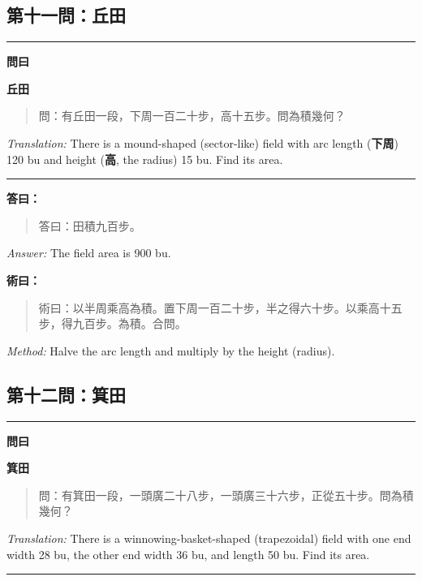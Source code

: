 \documentclass[11pt,a4paper]{article}
\newenvironment{problem}[1][]{%
  \medskip\noindent\rule{\textwidth}{0.4pt}%
  \par\noindent\textbf{\color{sectioncolor}#1}\par\nopagebreak%
  \smallskip%
}{%
  \par\noindent\rule{\textwidth}{0.4pt}\medskip%
}
\newenvironment{answer}{%
  \medskip\noindent{\color{answercolor}\rule{0.5\textwidth}{0.5pt}}%
  \par\color{answercolor}%
}{%
  \par\medskip%
}
\newenvironment{method}{%
  \medskip\noindent{\color{methodcolor}\rule{0.5\textwidth}{0.5pt}}%
  \par\color{methodcolor}%
}{%
  \par\medskip%
}
\begin{document}
\subsection*{第十一問：丘田}

\begin{problem}[\textbf{問曰}]
\textbf{\color{sectioncolor}丘田}

\begin{quote}
\textcolor{chinacolor}{%
問：有丘田一段，下周一百二十步，高十五步。問為積幾何？
}
\end{quote}

\textit{Translation:} There is a mound-shaped (sector-like) field with 
arc length (\textbf{下周}) 120 bu and height (\textbf{高}, the radius) 15 bu. 
Find its area.
\end{problem}

\begin{answer}
\textbf{答曰：}

\begin{quote}
\textcolor{chinacolor}{%
答曰：田積九百步。
}
\end{quote}

\textit{Answer:} The field area is 900 bu.
\end{answer}

\begin{method}
\textbf{術曰：}

\begin{quote}
\textcolor{chinacolor}{%
術曰：以半周乘高為積。置下周一百二十步，半之得六十步。以乘高十五步，得九百步。為積。合問。
}
\end{quote}

\textit{Method:} Halve the arc length and multiply by the height (radius).
\end{method}

\subsection*{第十二問：箕田}

\begin{problem}[\textbf{問曰}]
\textbf{\color{sectioncolor}箕田}

\begin{quote}
\textcolor{chinacolor}{%
問：有箕田一段，一頭廣二十八步，一頭廣三十六步，正從五十步。問為積幾何？
}
\end{quote}

\textit{Translation:} There is a winnowing-basket-shaped (trapezoidal) field 
with one end width 28 bu, the other end width 36 bu, and length 50 bu. 
Find its area.
\end{problem}
\end{document}
